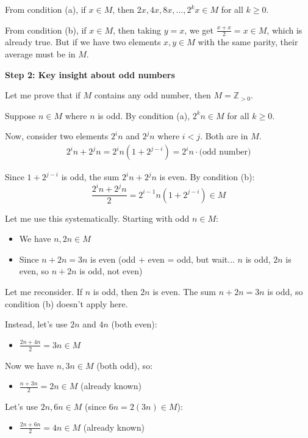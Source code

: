 \documentclass[12pt,a4paper]{article}
\theoremstyle{definition}
\begin{document}
    From condition (a), if $x \in M$, then $2x, 4x, 8x, \ldots, 2^k x \in M$ for all $k \geq 0$.

    From condition (b), if $x \in M$, then taking $y = x$, we get $\frac{x + x}{2} = x \in M$, which is already true. But if we have two elements $x, y \in M$ with the same parity, their average must be in $M$.

    \textbf{Step 2: Key insight about odd numbers}

    Let me prove that if $M$ contains any odd number, then $M = \mathbb{Z}_{>0}$.

    Suppose $n \in M$ where $n$ is odd. By condition (a), $2^k n \in M$ for all $k \geq 0$.

    Now, consider two elements $2^i n$ and $2^j n$ where $i < j$. Both are in $M$.
    \begin{align}
        2^i n + 2^j n = 2^i n(1 + 2^{j-i}) = 2^i n \cdot \text{(odd number)}
    \end{align}

    Since $1 + 2^{j-i}$ is odd, the sum $2^i n + 2^j n$ is even. By condition (b):
    $$\frac{2^i n + 2^j n}{2} = 2^{i-1} n(1 + 2^{j-i}) \in M$$

    Let me use this systematically. Starting with odd $n \in M$:
    \begin{itemize}
        \item We have $n, 2n \in M$
        \item Since $n + 2n = 3n$ is even (odd + even = odd, but wait... $n$ is odd, $2n$ is even, so $n + 2n$ is odd, not even)
    \end{itemize}

    Let me reconsider. If $n$ is odd, then $2n$ is even. The sum $n + 2n = 3n$ is odd, so condition (b) doesn't apply here.

    Instead, let's use $2n$ and $4n$ (both even):
    \begin{itemize}
        \item $\frac{2n + 4n}{2} = 3n \in M$
    \end{itemize}

    Now we have $n, 3n \in M$ (both odd), so:
    \begin{itemize}
        \item $\frac{n + 3n}{2} = 2n \in M$ (already known)
    \end{itemize}

    Let's use $2n, 6n \in M$ (since $6n = 2(3n) \in M$):
    \begin{itemize}
        \item $\frac{2n + 6n}{2} = 4n \in M$ (already known)
    \end{itemize}
\end{document}
